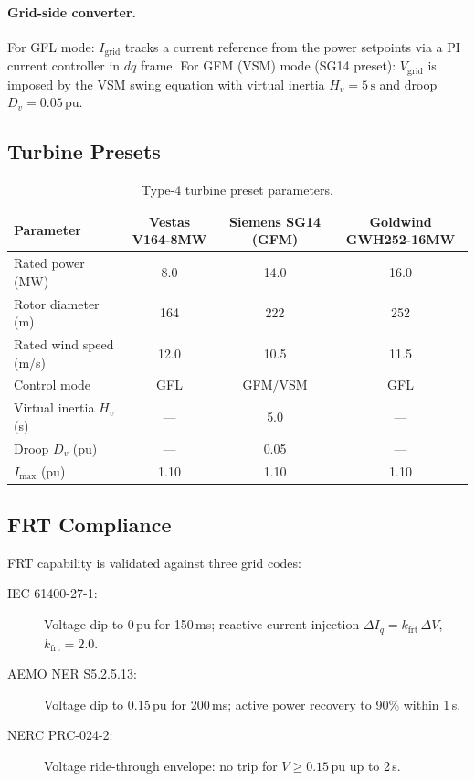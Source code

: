 \documentclass[11pt, a4paper]{article}
\newcommand{\pu}{\,\text{pu}}
\begin{document}
\paragraph{Grid-side converter.}
For GFL mode: $I_{\mathrm{grid}}$ tracks a current reference from the power
setpoints via a PI current controller in $dq$ frame.
For GFM (VSM) mode (SG14 preset): $V_{\mathrm{grid}}$ is imposed by the
VSM swing equation with virtual inertia $H_v = 5\,\text{s}$ and droop
$D_v = 0.05\pu$.

\subsection{Turbine Presets}

\begin{table}[ht]
\centering
\caption{Type-4 turbine preset parameters.}
\label{tab:presets}
\begin{tabular}{lccc}
\toprule
Parameter & Vestas V164-8MW & Siemens SG14 (GFM) & Goldwind GWH252-16MW \\
\midrule
Rated power (MW)      & 8.0  & 14.0 & 16.0 \\
Rotor diameter (m)    & 164  & 222  & 252  \\
Rated wind speed (m/s)& 12.0 & 10.5 & 11.5 \\
Control mode          & GFL  & GFM/VSM & GFL \\
Virtual inertia $H_v$ (s) & --- & 5.0 & --- \\
Droop $D_v$ (pu)      & ---  & 0.05 & --- \\
$I_{\mathrm{max}}$ (pu)   & 1.10 & 1.10 & 1.10 \\
\bottomrule
\end{tabular}
\end{table}

\subsection{FRT Compliance}

FRT capability is validated against three grid codes:

\begin{description}
  \item[IEC 61400-27-1:] Voltage dip to 0\,pu for 150\,ms; reactive current
    injection $\Delta I_q = k_{\mathrm{frt}}\,\Delta V$, $k_{\mathrm{frt}} = 2.0$.
  \item[AEMO NER S5.2.5.13:] Voltage dip to 0.15\,pu for 200\,ms;
    active power recovery to 90\% within 1\,s.
  \item[NERC PRC-024-2:] Voltage ride-through envelope: no trip for
    $V \geq 0.15\pu$ up to 2\,s.
\end{description}
\end{document}
